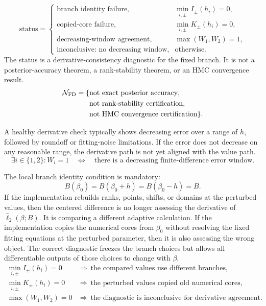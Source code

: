 \documentclass[11pt]{article}
\numberwithin{equation}{section}
\newcommand{\widehatell}{\widehat\ell}
\begin{document}
\begin{equation}
\text{status}
=
\begin{cases}
\text{branch identity failure},&
    \min_{i,\pm} I_\pm(h_i)=0,\\
\text{copied-core failure},&
    \min_{i,\pm} K_\pm(h_i)=0,\\
\text{decreasing-window agreement},&
    \max(W_1,W_2)=1,\\
\text{inconclusive: no decreasing window},&
    \text{otherwise}.
\end{cases}
\label{eq:p24-p22-fd5}
\end{equation}
The status is a derivative-consistency diagnostic for the fixed branch.  It is
not a posterior-accuracy theorem, a rank-stability theorem, or an HMC
convergence result.
\begin{equation}
    \begin{aligned}
    \mathcal N_{\rm FD}
    =
    \{&
    \text{not exact posterior accuracy},\\
    &\text{not rank-stability certification},\\
    &\text{not HMC convergence certification}\}.
    \end{aligned}
    \label{eq:p24-p22-fd7}
\end{equation}

A healthy derivative check typically shows decreasing error over a range of
\(h\), followed by roundoff or fitting-noise limitations.  If the error does
not decrease on any reasonable range, the derivative path is not yet aligned
with the value path.
\begin{equation}
    \exists i\in\{1,2\}: W_i=1
    \quad\Longleftrightarrow\quad
    \text{there is a decreasing finite-difference error window.}
    \label{eq:p24-p22-fd8}
\end{equation}

The local branch identity condition is mandatory:
\begin{equation}
    B(\beta_0)=B(\beta_0+h)=B(\beta_0-h)=B.
    \label{eq:p24-p22-fd6}
\end{equation}
If the implementation rebuilds ranks, points, shifts, or domains at the
perturbed values, then the centered difference is no longer assessing the
derivative of \(\widehatell_2(\beta;B)\).  It is comparing a different
adaptive calculation.
If the implementation copies the numerical cores from \(\beta_0\) without
resolving the fixed fitting equations at the perturbed parameter, then it is
also assessing the wrong object.  The correct diagnostic freezes the branch choices but
allows all differentiable outputs of those choices to change with \(\beta\).
\begin{equation}
    \begin{array}{ll}
    \min_{i,\pm}I_\pm(h_i)=0
    &\Rightarrow\ \text{the compared values use different branches},\\[2mm]
    \min_{i,\pm}K_\pm(h_i)=0
    &\Rightarrow\ \text{the perturbed values copied old numerical cores},\\[2mm]
    \max(W_1,W_2)=0
    &\Rightarrow\ \text{the diagnostic is inconclusive for derivative agreement}.
    \end{array}
    \label{eq:p24-p22-fd9}
\end{equation}
\end{document}
